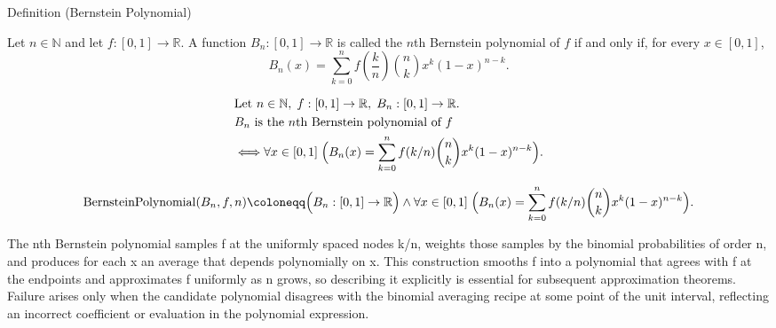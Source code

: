 
\begin{definitionbox}{Definition (Bernstein Polynomial)}
\begin{definition}
\label{def:bernstein-polynomial}
Let $n \in \mathbb{N}$ and let $f:[0,1]\to\mathbb{R}$.
A function $B_n:[0,1]\to\mathbb{R}$ is called the $n$th Bernstein polynomial of $f$
if and only if, for every $x \in [0,1]$,
\[
B_n(x)=\sum_{k=0}^{n} f\!\left(\frac{k}{n}\right)\binom{n}{k}x^k(1-x)^{n-k}.
\]
\end{definition}
\end{definitionbox}

\begin{remark*}
\[
\begin{aligned}
&\text{Let }n\in\mathbb{N},\; f:[0,1]\to\mathbb{R},\; B_n:[0,1]\to\mathbb{R}.\\
&B_n \text{ is the } n\text{th Bernstein polynomial of } f\\
&\Longleftrightarrow
\forall x\in[0,1]\;
\Bigl(
B_n(x)=\sum_{k=0}^n f(k/n)\binom{n}{k}x^k(1-x)^{n-k}
\Bigr).
\end{aligned}
\]
\end{remark*}

\begin{remark*}
\[
\operatorname{BernsteinPolynomial}(B_n,f,n)\coloneqq
\Bigl(B_n:[0,1]\to\mathbb{R}\Bigr)\land
\forall x\in[0,1]\;
\Bigl(
B_n(x)=\sum_{k=0}^n f(k/n)\binom{n}{k}x^k(1-x)^{n-k}
\Bigr).
\]
\end{remark*}

\begin{remark*}[Interpretation]
The nth Bernstein polynomial samples f at the uniformly spaced nodes k/n, weights those samples by the binomial probabilities of order n, and produces for each x an average that depends polynomially on x. This construction smooths f into a polynomial that agrees with f at the endpoints and approximates f uniformly as n grows, so describing it explicitly is essential for subsequent approximation theorems. Failure arises only when the candidate polynomial disagrees with the binomial averaging recipe at some point of the unit interval, reflecting an incorrect coefficient or evaluation in the polynomial expression.
\end{remark*}

